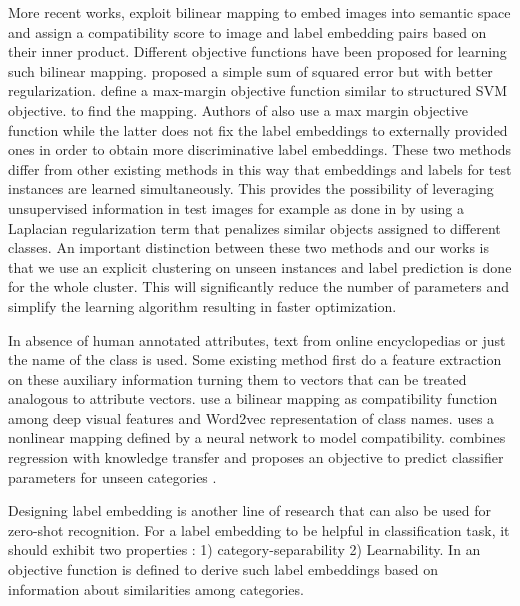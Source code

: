 \documentclass[wcp]{jmlr}
\begin{document}

More recent works, exploit bilinear mapping to embed images into semantic space and assign a compatibility score to image and label embedding
 pairs based on their inner product. Different objective functions have been proposed for learning such bilinear mapping. \cite{emb15}
 proposed a simple sum of squared error but with better regularization.
\cite{li15max} define a max-margin objective function similar to structured SVM objective.
 to find the mapping. Authors of \cite{li15max, semi15} also use a max margin objective function
while the latter does not fix the label embeddings to externally provided ones in order to obtain more discriminative label embeddings. These two methods
differ from other existing methods in this way that embeddings and labels for test instances are learned simultaneously. This provides the possibility of
leveraging unsupervised information in test images for example as done in \cite{semi15} by using a Laplacian regularization term that penalizes
 similar objects assigned to different classes.
 An important distinction between these two methods and our works is that we use an explicit clustering on unseen instances
 and label prediction is done for the whole cluster. This will significantly reduce the number of parameters
 and simplify the learning algorithm resulting in faster optimization.

 In absence of human annotated attributes, text from online encyclopedias or just the name of the class is used. Some existing method
 first do a feature extraction on these auxiliary information turning them to vectors that can be treated analogous to attribute vectors.
 \cite{devise} use a bilinear mapping as compatibility function among deep visual features and Word2vec \cite{word2vec} representation of
 class names. \cite{ba2015} uses a nonlinear mapping defined by a neural network to model compatibility.
  \cite{mohamed13} combines regression with knowledge transfer and proposes an objective to predict classifier parameters
 for unseen categories .

 Designing label embedding is another line of research that can also be used for zero-shot recognition. For a label embedding to be helpful in classification task,
 it should exhibit two properties \cite{Yu2013}: 1) category-separability 2) Learnability. In \cite{Yu2013} an objective function is defined to derive
 such label embeddings based on information about similarities among categories.
\end{document}

